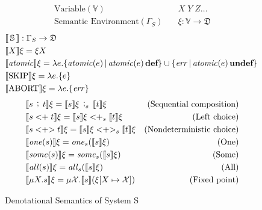 \begin{figure}[t]
\begin{align*}
    \text{Variable}(\mathbb{V}) \quad &X\; Y\; Z \dots \\
    \text{Semantic Environment}(\Gamma_S) \quad &\xi : \mathbb{V} \to \mathfrak{D}
\end{align*}
\vspace{-3.0em}
\begin{align*}
    &\llbracket \,\mathbb{S}\, \rrbracket : \Gamma_S \rightarrow \mathfrak{D}\\
    &\llbracket X \rrbracket \xi = \xi X \\
    &\llbracket \text{\textit{atomic}} \rrbracket \xi = \lambda e. \{\text{\textit{atomic}}(e) \,|\, \text{\textit{atomic}}(e)\, \textbf{def} \} \cup \{\mathit{err} \,|\, \text{\textit{atomic}}(e)\, \textbf{undef}\}\;\,\\
    &\llbracket \text{SKIP} \rrbracket \xi = \lambda e. \{e\} \\
    &\llbracket \text{ABORT} \rrbracket \xi = \lambda e. \{\mathit{err}\}
\end{align*}
\vspace{-3.0em}
\begin{align*}
    &\llbracket s \, \mathrel{\mathop;} \, t \rrbracket \xi = \llbracket s \rrbracket \xi \, \mathrel{\mathop;}_s \, \llbracket t \rrbracket \xi &\text{(Sequential composition)}\\
    &\llbracket s <\mathrel{\mathop+} t \rrbracket \xi = \llbracket s \rrbracket \xi <\mathrel{\mathop+}_s \llbracket t \rrbracket \xi &\text{(Left choice)}\\
    &\llbracket s <\mathrel{\mathop+}\mathrel{\mathop>} t \rrbracket \xi = \llbracket s \rrbracket \xi <\mathrel{\mathop+}\mathrel{\mathop>}_s \llbracket t \rrbracket \xi &\text{(Nondeterministic choice)}\\
    &\llbracket \text{\textit{one}\/}(s) \rrbracket \xi = \text{\textit{one}\/}_{s} (\llbracket s \rrbracket \xi) &\text{(One)}\\
    &\llbracket \text{\textit{some}\/}(s) \rrbracket \xi = \text{\textit{some}\/}_{s} (\llbracket s \rrbracket \xi) &\text{(Some)}\\
    &\llbracket \text{\textit{all}\/}(s) \rrbracket \xi = \text{\textit{all}\/}_{s} (\llbracket s \rrbracket \xi) &\text{(All)} \\
    &\llbracket \mu X. s\rrbracket \xi = \mu \mathcal{X}. \llbracket s \rrbracket (\xi[X \mapsto \mathcal{X}]) &\text{(Fixed point)}
\end{align*}
\vspace{-1.5em}
\caption{Denotational Semantics of System S}
\label{chap4:semantics:denotational}
\end{figure}

